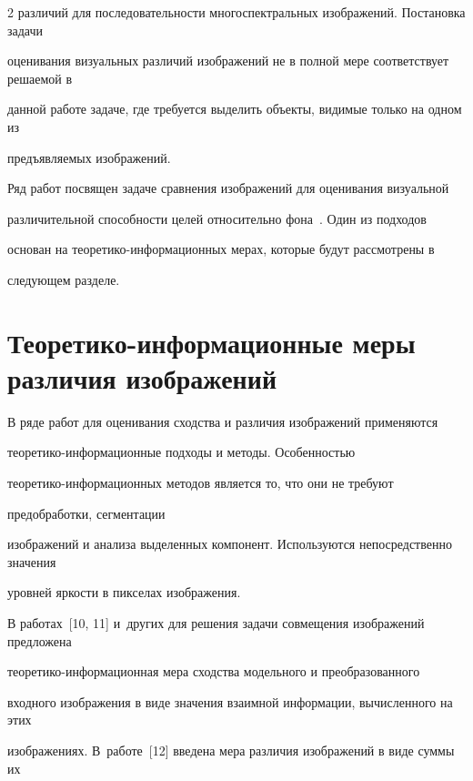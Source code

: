 \begin{multicols}{2}
различий для последо\-ва\-тель\-ности многоспектральных изоб\-ра\-же\-ний. Постановка задачи 


оценивания визуальных различий изображений не в полной мере соответствует решаемой в 


данной работе задаче, где требуется выделить объекты, видимые только на одном из 


предъявляемых изображений.


  


  Ряд работ посвящен задаче сравнения изображений для оценивания визуальной 


различительной способности целей относительно фона~\cite{9mur}. Один из подходов 


основан на тео\-ре\-ти\-ко-ин\-фор\-ма\-ци\-он\-ных мерах, которые будут рассмотрены в 


следующем разделе.





\section{Теоретико-информационные меры различия изображений}


  


  В ряде работ для оценивания сходства и различия изображений применяются 


  тео\-ре\-ти\-ко-ин\-фор\-ма\-ци\-он\-ные подходы и методы. Особенностью 


  тео\-ре\-ти\-ко-информационных методов является то, что они не требуют 


  предобработки, сегментации 


изоб\-ра\-же\-ний и анализа выделенных компонент. Используются непосредственно значения 


уровней яркости в пикселах изображения.


  


  В работах~[10, 11] и~других для решения задачи совмещения изображений предложена 


  тео\-ре\-ти\-ко-ин\-фор\-ма\-ци\-он\-ная мера сходства модельного и преобразованного 


входного изображения в виде значения взаимной информации, вычисленного на этих 


изображениях. В~работе~[12] введена мера различия изображений в виде суммы их 



\end{multicols}
